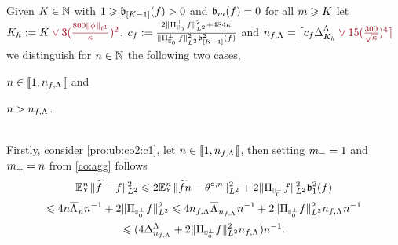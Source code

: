 \begin{pro}\label{pro:ub:co2}
Given $K\in\Nz$   with   $1\geq \bias[{[K-1] }](\xdf)>0$ and
$\bias(\xdf)=0$ for all $\Di\geq K$ let $K_{\ydf}:=K\dr\vee
3(\tfrac{800\Vnormlp[1]{\fydf}}{\cpen})^2$, 
$c_{\xdf}:=\tfrac{2\VnormLp{\Proj[{\mHiH[0]}]^\perp\xdf}^2+484\cpen}{\VnormLp{\Proj[{\mHiH[0]}]^\perp\xdf}^2\bias[{[K-1]}]^2(\xdf)}$
and
$\ssY_{\xdf,\iSv}=\ceil{c_{\xdf}\DipenSv[K_{\ydf}]\dr\vee15(\tfrac{300}{\sqrt{\cpen}})^4}$
we distinguish for $\ssY\in\Nz$ the following two
cases, \begin{inparaenum}[i]\renewcommand{\theenumi}{\dgrau\rm(\alph{enumi})}\item\label{pro:ub:co2:c1}
$\ssY\in\nsetro{1,\ssY_{\xdf,\iSv}}$ and \item\label{pro:ub:co2:c2}
$\ssY>\ssY_{\xdf,\iSv}$.\end{inparaenum}\\

Firstly, consider \ref{pro:ub:co2:c1},  let
$\ssY\in\nsetro{1,\ssY_{\xdf,\iSv}}$, then setting $\mDi=1$ and
$\pDi=\ssY$ from \cref{co:agg} follows
\begin{multline}\label{pro:ub:co2:e1}
\FuEx[\ssY]{\rY} \VnormLp{\txdf-\xdf}^2\leq 2\FuEx[\ssY]{\rY}\VnormLp{\txdfPr[\ssY]-\xdfPr[\ssY]}^2+2\VnormLp{\Proj[{\mHiH[0]^\perp}]\xdf}^2\bias[1]^2(\xdf)
\\\hfill\leq 4\ssY\oiSv[\ssY]\ssY^{-1}+2\VnormLp{\Proj[{\mHiH[0]^\perp}]\xdf}^2\leq
4 \ssY_{\xdf,\iSv}\oiSv[\ssY_{\xdf,\iSv}]\ssY^{-1}+2\VnormLp{\Proj[{\mHiH[0]^\perp}]\xdf}^2\ssY_{\xdf,\iSv}\ssY^{-1}\\\leq(4\DipenSv[\ssY_{\xdf,\iSv}]+2\VnormLp{\Proj[{\mHiH[0]^\perp}]\xdf}^2\ssY_{\xdf,\iSv})\ssY^{-1}.
\end{multline}


\end{pro}
